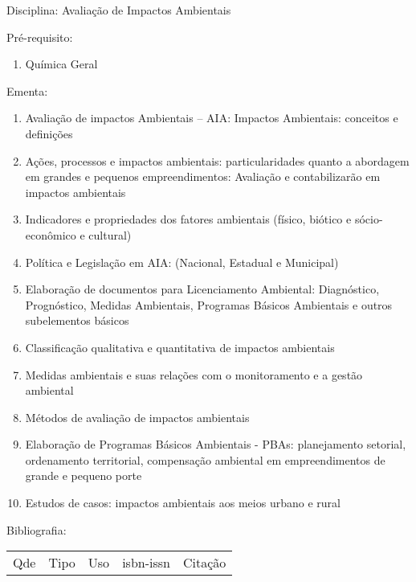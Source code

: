 \documentclass[12pt,a4paper,twoside]{report}
\begin{document}
Disciplina: Avaliação de Impactos Ambientais

Pré-requisito:
\begin{enumerate}
\item Química Geral
\end{enumerate}

Ementa:
\begin{enumerate}
\item Avaliação de impactos Ambientais – AIA: Impactos Ambientais: conceitos e definições
\item Ações, processos e impactos ambientais: particularidades quanto a abordagem em grandes e pequenos empreendimentos: Avaliação e contabilizarão em impactos ambientais
\item Indicadores e propriedades dos fatores ambientais (físico, biótico e sócio-econômico e cultural)
\item Política e Legislação em AIA: (Nacional, Estadual e Municipal)
\item Elaboração de documentos para Licenciamento Ambiental: Diagnóstico, Prognóstico, Medidas Ambientais, Programas Básicos Ambientais e outros subelementos básicos
\item Classificação qualitativa e quantitativa de impactos ambientais
\item Medidas ambientais e suas relações com o monitoramento e a gestão ambiental
\item Métodos de avaliação de impactos ambientais
\item Elaboração de Programas Básicos Ambientais - PBAs: planejamento setorial, ordenamento territorial, compensação ambiental em empreendimentos de grande e pequeno porte
\item Estudos de casos: impactos ambientais aos meios urbano e rural
\end{enumerate}

Bibliografia:
\begin{tabular}{lllll}
Qde & Tipo & Uso & isbn-issn & Citação \\
\end{tabular}
\end{document}
